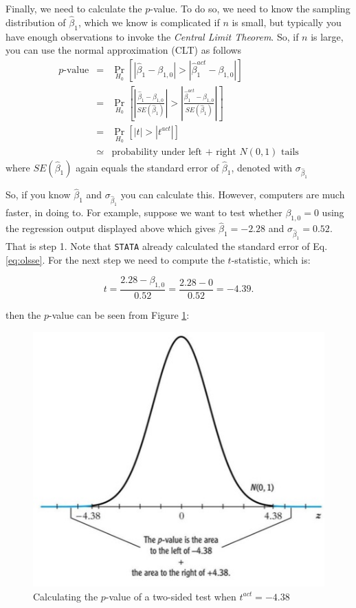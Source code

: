 \documentclass[
]{book}
\begin{document}
Finally, we need to calculate the \(p\)-value. To do so, we need to know the sampling distribution of \(\hat{\beta}_1\), which we know is complicated if \(n\) is small, but typically you have enough observations to invoke the \emph{Central Limit Theorem}. So, if \(n\) is large, you can use the normal approximation (CLT) as follows
\begin{eqnarray}
                        p\text{-value}& = &   \Pr_{H_0}\left[\left|\hat{\beta}_1 - \beta_{1,0}\right| > \left|\hat{\beta}_1^{act} - \beta_{1,0}\right|\right]\\
            & = &   \Pr_{H_0}\left[\left|\frac{\hat{\beta}_1 - \beta_{1,0}}{SE(\hat{\beta}_1)}\right| > \left|\frac{\hat{\beta}_1 ^{act} - \beta_{1,0}}{SE(\hat{\beta}_1)}\right|\right]\\
            & = &   \Pr_{H_0}[|t| > |t^{act}|]\\
                        &\simeq& \text{probability under left + right } N(0,1) \text{ tails}
\end{eqnarray}
where \(SE(\hat{\beta}_1)\) again equals the standard error of \(\hat{\beta}_1\), denoted with \(\sigma_{\hat{\beta}_1}\)

So, if you know \(\hat{\beta}_1\) and \(\sigma_{\hat{\beta}_1}\) you can calculate this. However, computers are much faster, in doing to. For example, suppose we want to test whether \(\beta_{1,0} = 0\) using the regression output displayed above which gives \(\hat{\beta}_1 = -2.28\) and \(\sigma_{\hat{\beta}_1} = 0.52\). That is step 1. Note that \texttt{STATA} already calculated the standard error of Eq. \eqref{eq:olsse}. For the next step we need to compute the \(t\)-statistic, which is:

\begin{equation}
t = \frac{2.28 - \beta_{1,0}}{0.52} = \frac{2.28 - 0}{0.52} = -4.39.
\label{eq:olstemp}
\end{equation}

then the \(p\)-value can be seen from Figure \ref{fig:pvalues}:

\begin{figure}
\centering
\includegraphics{./figures/lecture_sheet9.jpg}
\caption{\label{fig:pvalues}Calculating the \(p\)-value of a two-sided test when \(t^{act} = -4.38\)}
\end{figure}
\end{document}
